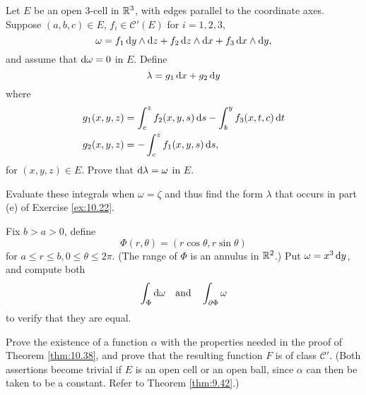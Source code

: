 \begin{myexercise}
    \label{ex:10.27}
    Let $E$ be an open 3-cell in ${\protect\mathbb R}^3$, with edges parallel to the coordinate axes.
    Suppose $(a, b, c) \in E$, $f_i \in \mathscr{C}'(E)$ for $i = 1, 2, 3$,
    \begin{equation*}
        \omega =
        f_1 \d y \wedge \d z +
        f_2 \d z \wedge \d x +
        f_3 \d x \wedge \d y ,
    \end{equation*}
    and assume that $\d \omega = 0$ in $E$.
    Define
    \begin{equation*}
        \lambda = g_1 \d x + g_2 \d y
    \end{equation*}
    where
    \begin{align*}
        g_1(x,y,z) & = \int_{c}^{z} f_2(x,y,s) \d s - \int_{b}^{y} f_3(x,t,c) \d t \\
        g_2(x,y,z) & = -\int_{c}^{z} f_1(x,y,s) \d s ,
    \end{align*}
    for $(x, y, z) \in E$.
    Prove that $\d \lambda = \omega$ in $E$.

    Evaluate these integrals when $\omega = \zeta$ and thus find the form $\lambda$ that occurs in part (e) of Exercise \ref{ex:10.22}.
\end{myexercise}


\begin{myexercise}
    \label{ex:10.28}
    Fix $b > a > 0$, define
    \begin{equation*}
        \Phi(r, \theta) = (r \cos \theta, r \sin \theta)
    \end{equation*}
    for $a \leq r \leq b, 0 \leq \theta \leq 2\pi$.
    (The range of $\Phi$ is an annulus in ${\protect\mathbb R}^2$.)
    Put $\omega = x^3 \d y$,
    and compute both
    \begin{equation*}
        \int_{\Phi} \d \omega
        \quad \text{and} \quad
        \int_{\partial \Phi} \omega
    \end{equation*}
    to verify that they are equal.
\end{myexercise}


\begin{myexercise}
    \label{ex:10.29}
    Prove the existence of a function $\alpha$ with the properties needed in the proof of Theorem \ref{thm:10.38},
    and prove that the resulting function $F$ is of class $\mathscr{C}'$.
    (Both assertions become trivial if $E$ is an open cell or an open ball,
    since $\alpha$ can then be taken to be a constant.
    Refer to Theorem \ref{thm:9.42}.)
\end{myexercise}



